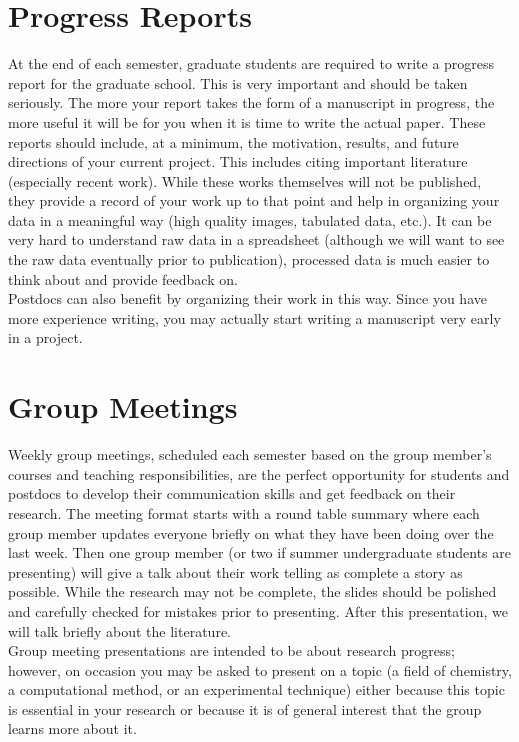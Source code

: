 \documentclass[letterpaper]{article}
\begin{document}
\section*{Progress Reports}
At the end of each semester, graduate students are required to write a progress report for the graduate school. This is very important and should be taken seriously. The more your report takes the form of a manuscript in progress, the more useful it will be for you when it is time to write the actual paper. These reports should include, at a minimum, the motivation, results, and future directions of your current project. This includes citing important literature (especially recent work). While these works themselves will not be published, they provide a record of your work up to that point and help in organizing your data in a meaningful way (high quality images, tabulated data, etc.). It can be very hard to understand raw data in a spreadsheet (although we will want to see the raw data eventually prior to publication), processed data is much easier to think about and provide feedback on.\\

Postdocs can also benefit by organizing their work in this way. Since you have more experience writing, you may actually start writing a manuscript very early in a project. 

\section*{Group Meetings}
Weekly group meetings, scheduled each semester based on the group member's courses and teaching responsibilities, are the perfect opportunity for students and postdocs to develop their communication skills and get feedback on their research. The meeting format starts with a round table summary where each group member updates everyone briefly on what they have been doing over the last week. Then one group member (or two if summer undergraduate students are presenting) will give a talk about their work telling as complete a story as possible. While the research may not be complete, the slides should be polished and carefully checked for mistakes prior to presenting. After this presentation, we will talk briefly about the literature.\\

Group meeting presentations are intended to be about research progress; however, on occasion you may be asked to present on a topic (a field of chemistry, a computational method, or an experimental technique) either because this topic is essential in your research or because it is of general interest that the group learns more about it. \\
\end{document}
